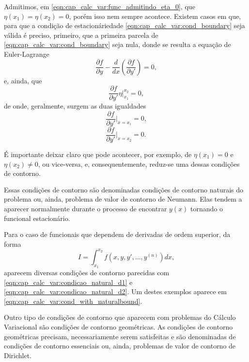 \documentclass[
	12pt,				%
	openright,			%
    twoside,			%
	a4paper,			%
	english,			%
	french,				%
	spanish,			%
	brazil				%
	]{abntex2}
\numberwithin{lema}{chapter}
\numberwithin{teorema}{chapter}
\numberwithin{definicao}{chapter}
\numberwithin{exemplo}{chapter}
\numberwithin{figure}{chapter}
\begin{document}
Admitimos, em \eqref{eqn:cap_calc_var:func_admitindo_eta_0}, que $\eta(x_1)=\eta(x_2)=0$, porém isso nem sempre acontece. Existem casos em que, para que a condição de estacionáriedade \eqref{eqn:cap_calc_var:cond_boundary} seja válida é preciso, primeiro, que a primeira parcela de \eqref{eqn:cap_calc_var:cond_boundary} seja nula, donde se resulta a equação de Euler-Lagrange
$$
	\frac{\partial f}{\partial y}
	-
	\frac{d}{dx}\left (
		\frac{\partial f}{\partial y'}
	\right )
	= 0
	\text{,}
$$
e, ainda, que
$$
	\frac{\partial f}{\partial y'}\eta \Big |_{x_1}^{x_2} = 0
	\text{,}
$$
de onde, geralmente, surgem as duas igualdades
\begin{equation}
	\label{eqn:cap_calc_var:condicao_natural_d1}
	\frac{\partial f}{\partial y'} \Big |_{x=x_1} = 0
	\text{,}
\end{equation}
\begin{equation}
	\label{eqn:cap_calc_var:condicao_natural_d2}
	\frac{\partial f}{\partial y'} \Big |_{x=x_2} = 0
	\text{.}
\end{equation}

É importante deixar claro que pode acontecer, por exemplo, de $\eta(x_1)=0$ e $\eta(x_2)\neq 0$, ou vice-versa, e, consequentemente, reduz-se uma dessas condições de contorno.

Essas condições de contorno são denominadas condições de contorno naturais do problema ou, ainda, problema de valor de contorno de Neumann. Elas tendem a aparecer normalmente durante o processo de encontrar $y(x)$ tornando o funcional estacionário.

Para o caso de funcionais que dependem de derivadas de ordem superior, da forma
$$
	I=\int_{x_1}^{x_2} f(x, y, y', \dots, y^{(n)}) dx
	\text{,}
$$
aparecem diversas condições de contorno parecidas com \eqref{eqn:cap_calc_var:condicao_natural_d1} e \eqref{eqn:cap_calc_var:condicao_natural_d2}. Um destes exemplos aparece em \eqref{eqn:cap_calc_var:cond_with_naturalbound}.

Outro tipo de condições de contorno que aparecem com problemas do Cálculo Variacional são condições de contorno geométricas. As condições de contorno geométricas precisam, necessariamente serem satisfeitas e são denominadas de condições de contorno essenciais ou, ainda, problemas de valor de contorno de Dirichlet.
\end{document}

